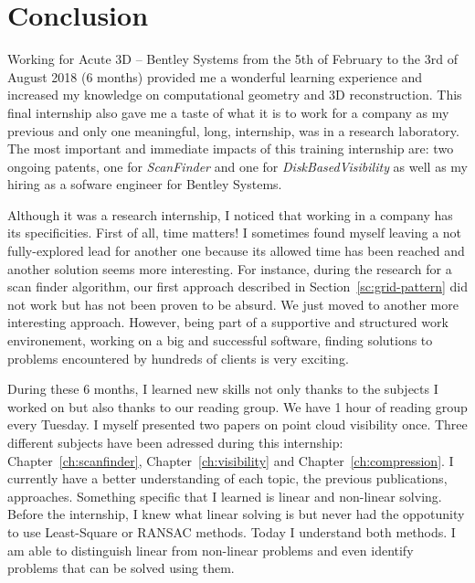 \chapter{Conclusion}
\label{ch:conclusion}

Working for Acute 3D -- Bentley Systems from the 5th of February to the 3rd of August 2018 (6 months) provided me a wonderful learning experience and increased my knowledge on computational geometry and 3D reconstruction. This final internship also gave me a taste of what it is to work for a company as my previous and only one meaningful, long, internship, was in a research laboratory. The most important and immediate impacts of this training internship are: two ongoing patents, one for
\emph{ScanFinder} and one for \emph{DiskBasedVisibility} as well as my hiring as a sofware engineer for Bentley Systems.

Although it was a research internship, I noticed that working in a company has its specificities. First of all, time matters! I sometimes found myself leaving a not fully-explored lead for another one because its allowed time has been reached and another solution seems more interesting. For instance, during the research for a scan finder algorithm, our first approach described in Section~\ref{sc:grid-pattern} did not work but has not been proven to be absurd. We just moved to another more
interesting approach. However, being part of a supportive and structured work environement, working on a big and successful software, finding solutions to problems encountered by hundreds of clients is very exciting.

During these 6 months, I learned new skills not only thanks to the subjects I worked on but also thanks to our reading group. We have 1 hour of reading group every Tuesday. I myself presented two papers on point cloud visibility once. Three different subjects have been adressed during this internship: Chapter~\ref{ch:scanfinder}, Chapter~\ref{ch:visibility} and Chapter~\ref{ch:compression}. I currently have a better understanding of each topic, the previous publications,
approaches. Something specific that I learned is linear and non-linear solving. Before the internship, I knew what linear solving is but never had the oppotunity to use Least-Square or RANSAC methods. Today I understand both methods. I am able to distinguish linear from non-linear problems and even identify problems that can be solved using them.
